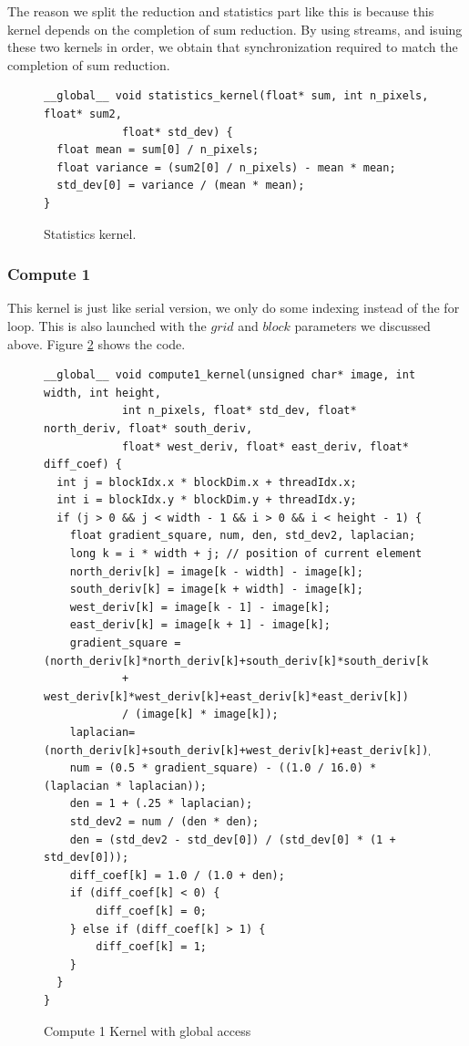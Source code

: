 \documentclass[12pt,reqno]{amsart}
\begin{document}
The reason we split the reduction and statistics part like this is because this kernel depends on the completion of sum reduction. By using streams, and isuing these two kernels in order, we obtain that synchronization required to match the completion of sum reduction. 

\begin{figure}[!h]
\centering
\begin{lstlisting}
__global__ void statistics_kernel(float* sum, int n_pixels, float* sum2, 
            float* std_dev) { 
  float mean = sum[0] / n_pixels;
  float variance = (sum2[0] / n_pixels) - mean * mean;
  std_dev[0] = variance / (mean * mean);
}
\end{lstlisting}
\caption{Statistics kernel.}
\label{fig:statsk}
\end{figure}

\subsubsection{Compute 1} 

This kernel is just like serial version, we only do some indexing instead of the for loop. This is also launched with the $grid$ and $block$ parameters we discussed above. Figure \ref{fig:c1kernel_reg} shows the code.
\begin{figure}[!h]
\centering
\begin{lstlisting}
__global__ void compute1_kernel(unsigned char* image, int width, int height,
            int n_pixels, float* std_dev, float* north_deriv, float* south_deriv, 
            float* west_deriv, float* east_deriv, float* diff_coef) {
  int j = blockIdx.x * blockDim.x + threadIdx.x; 
  int i = blockIdx.y * blockDim.y + threadIdx.y;
  if (j > 0 && j < width - 1 && i > 0 && i < height - 1) {
    float gradient_square, num, den, std_dev2, laplacian;
    long k = i * width + j;	// position of current element
    north_deriv[k] = image[k - width] - image[k];
    south_deriv[k] = image[k + width] - image[k];
    west_deriv[k] = image[k - 1] - image[k];
    east_deriv[k] = image[k + 1] - image[k];
    gradient_square =(north_deriv[k]*north_deriv[k]+south_deriv[k]*south_deriv[k]
            + west_deriv[k]*west_deriv[k]+east_deriv[k]*east_deriv[k]) 
            / (image[k] * image[k]);
    laplacian=(north_deriv[k]+south_deriv[k]+west_deriv[k]+east_deriv[k])/image[k];
    num = (0.5 * gradient_square) - ((1.0 / 16.0) * (laplacian * laplacian)); 
    den = 1 + (.25 * laplacian);
    std_dev2 = num / (den * den); 
    den = (std_dev2 - std_dev[0]) / (std_dev[0] * (1 + std_dev[0]));
    diff_coef[k] = 1.0 / (1.0 + den);
    if (diff_coef[k] < 0) {
        diff_coef[k] = 0;
    } else if (diff_coef[k] > 1) {
        diff_coef[k] = 1;
    }
  }	
}
\end{lstlisting}
\caption{Compute 1 Kernel with global access}
\label{fig:c1kernel_reg}
\end{figure}
\end{document}
